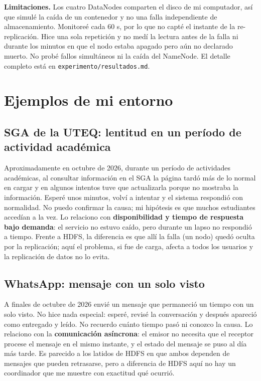 \documentclass[11pt,a4paper]{article}
\begin{document}
\textbf{Limitaciones.} Los cuatro DataNodes comparten el disco de mi computador, así que simulé la caída de un contenedor y no una falla independiente de almacenamiento. Monitoreé cada 60 s, por lo que no capté el instante de la re-replicación. Hice una sola repetición y no medí la lectura antes de la falla ni durante los minutos en que el nodo estaba apagado pero aún no declarado muerto. No probé fallos simultáneos ni la caída del NameNode. El detalle completo está en \texttt{experimento/resultados.md}.

\section{Ejemplos de mi entorno}\label{sec:ejemplos}

\subsection{SGA de la UTEQ: lentitud en un período de actividad académica}
Aproximadamente en octubre de 2026, durante un período de actividades académicas, al consultar información en el SGA la página tardó más de lo normal en cargar y en algunos intentos tuve que actualizarla porque no mostraba la información. Esperé unos minutos, volví a intentar y el sistema respondió con normalidad. No puedo confirmar la causa; mi hipótesis es que muchos estudiantes accedían a la vez. Lo relaciono con \textbf{disponibilidad y tiempo de respuesta bajo demanda}: el servicio no estuvo caído, pero durante un lapso no respondió a tiempo. Frente a HDFS, la diferencia es que allí la falla (un nodo) quedó oculta por la replicación; aquí el problema, si fue de carga, afecta a todos los usuarios y la replicación de datos no lo evita.

\subsection{WhatsApp: mensaje con un solo visto}
A finales de octubre de 2026 envié un mensaje que permaneció un tiempo con un solo visto. No hice nada especial: esperé, revisé la conversación y después apareció como entregado y leído. No recuerdo cuánto tiempo pasó ni conozco la causa. Lo relaciono con la \textbf{comunicación asíncrona}: el emisor no necesita que el receptor procese el mensaje en el mismo instante, y el estado del mensaje se puso al día más tarde. Es parecido a los latidos de HDFS en que ambos dependen de mensajes que pueden retrasarse, pero a diferencia de HDFS aquí no hay un coordinador que me muestre con exactitud qué ocurrió.
\end{document}
